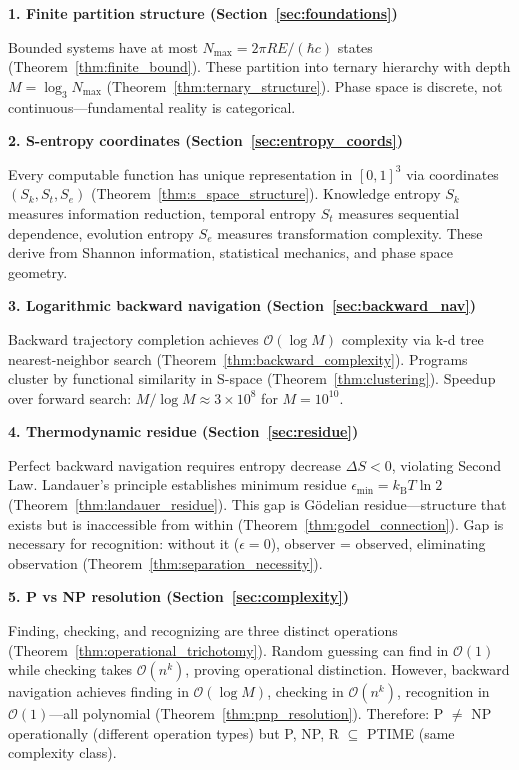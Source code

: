 \documentclass[twocolumn,10pt]{article}
\theoremstyle{definition}
\theoremstyle{remark}
\newcommand{\kB}{k_{\text{B}}}
\newcommand{\Sk}{S_k}
\newcommand{\St}{S_t}
\newcommand{\Se}{S_e}
\newcommand{\Nmax}{N_{\max}}
\newcommand{\bigO}{\mathcal{O}}
\begin{document}
\vspace{0.2cm}
\noindent\textbf{1. Finite partition structure (Section~\ref{sec:foundations})}

Bounded systems have at most $\Nmax = 2\pi RE/(\hbar c)$ states (Theorem~\ref{thm:finite_bound}). These partition into ternary hierarchy with depth $M = \log_3 \Nmax$ (Theorem~\ref{thm:ternary_structure}). Phase space is discrete, not continuous—fundamental reality is categorical.

\vspace{0.2cm}
\noindent\textbf{2. S-entropy coordinates (Section~\ref{sec:entropy_coords})}

Every computable function has unique representation in $[0,1]^3$ via coordinates $(\Sk, \St, \Se)$ (Theorem~\ref{thm:s_space_structure}). Knowledge entropy $\Sk$ measures information reduction, temporal entropy $\St$ measures sequential dependence, evolution entropy $\Se$ measures transformation complexity. These derive from Shannon information\cite{shannon1948}, statistical mechanics\cite{boltzmann1877}, and phase space geometry.

\vspace{0.2cm}
\noindent\textbf{3. Logarithmic backward navigation (Section~\ref{sec:backward_nav})}

Backward trajectory completion achieves $\bigO(\log M)$ complexity via k-d tree nearest-neighbor search (Theorem~\ref{thm:backward_complexity}). Programs cluster by functional similarity in S-space (Theorem~\ref{thm:clustering}). Speedup over forward search: $M/\log M \approx 3 \times 10^8$ for $M=10^{10}$.

\vspace{0.2cm}
\noindent\textbf{4. Thermodynamic residue (Section~\ref{sec:residue})}

Perfect backward navigation requires entropy decrease $\Delta S < 0$, violating Second Law. Landauer's principle establishes minimum residue $\epsilon_{\min} = \kB T \ln 2$ (Theorem~\ref{thm:landauer_residue}). This gap is Gödelian residue—structure that exists but is inaccessible from within (Theorem~\ref{thm:godel_connection}). Gap is necessary for recognition: without it ($\epsilon=0$), observer = observed, eliminating observation (Theorem~\ref{thm:separation_necessity}).

\vspace{0.2cm}
\noindent\textbf{5. P vs NP resolution (Section~\ref{sec:complexity})}

Finding, checking, and recognizing are three distinct operations (Theorem~\ref{thm:operational_trichotomy}). Random guessing can find in $\bigO(1)$ while checking takes $\bigO(n^k)$, proving operational distinction. However, backward navigation achieves finding in $\bigO(\log M)$, checking in $\bigO(n^k)$, recognition in $\bigO(1)$—all polynomial (Theorem~\ref{thm:pnp_resolution}). Therefore: P $\neq$ NP operationally (different operation types) but P, NP, R $\subseteq$ PTIME (same complexity class).
\end{document}
